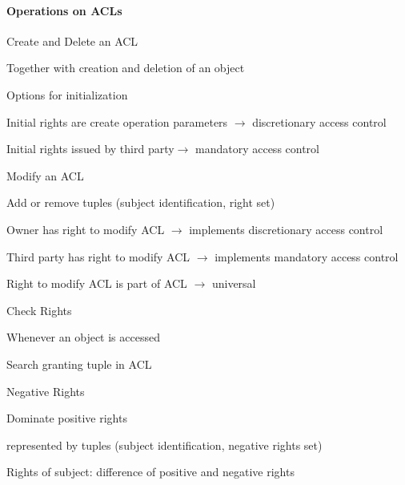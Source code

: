 \documentclass[a4paper]{article}
\begin{document}
\begin{multicols}{3}
    \paragraph{Operations on ACLs}
    Create and Delete an ACL
    \begin{itemize*}
        \item Together with creation and deletion of an object
        \item Options for initialization
        \begin{itemize*}
            \item Initial rights are create operation parameters $\rightarrow$ discretionary access control
            \item Initial rights issued by third party$\rightarrow$ mandatory access control
        \end{itemize*}
    \end{itemize*}

    Modify an ACL
    \begin{itemize*}
        \item Add or remove tuples (subject identification, right set)
        \item Owner has right to modify ACL $\rightarrow$ implements discretionary access control
        \item Third party has right to modify ACL $\rightarrow$ implements mandatory access control
        \item Right to modify ACL is part of ACL $\rightarrow$ universal
    \end{itemize*}

    Check Rights
    \begin{itemize*}
        \item Whenever an object is accessed
        \item Search granting tuple in ACL
    \end{itemize*}

    Negative Rights
    \begin{itemize*}
        \item Dominate positive rights
        \item represented by tuples (subject identification, negative rights set)
        \item Rights of subject: difference of positive and negative rights
    \end{itemize*}


\end{multicols}
\end{document}

